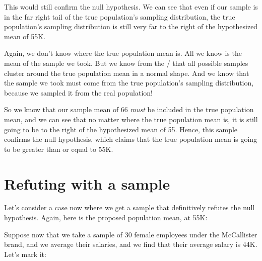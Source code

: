 \documentclass[../../../main.tex]{subfiles}
\begin{document}
\noindent
This would still confirm the null hypothesis. We can see that even if our sample is in the far right tail of the true population's sampling distribution, the true population's sampling distribution is still very far to the right of the hypothesized mean of 55K. 

Again, we don't know where the true population mean is. All we know is the mean of the sample we took. But we know from the \CLT/ that all possible samples cluster around the true population mean in a normal shape. And we know that the sample we took must come from the true population's sampling distribution, because we sampled it from the real population! 

So we know that our sample mean of 66 \emph{must} be included in the true population mean, and we can see that no matter where the true population mean is, it is still going to be to the right of the hypothesized mean of 55. Hence, this sample confirms the null hypothesis, which claims that the true population mean is going to be greater than or equal to 55K.


\section{Refuting with a sample}

Let's consider a case now where we get a sample that definitively refutes the null hypothesis. Again, here is the proposed population mean, at 55K:

\begin{center}
\end{center}

\noindent
Suppose now that we take a sample of 30 female employees under the McCallister brand, and we average their salaries, and we find that their average salary is 44K. Let's mark it:
\end{document}
